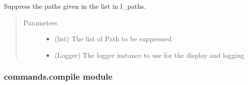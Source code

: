\documentclass[a4paper,10pt,english]{sphinxmanual}
\begin{document}

\begin{fulllineitems}
\label{\detokenize{apidoc_commands/commands:commands.clean.suppress_directories}}
Suppress the paths given in the list in l\_paths.
\begin{quote}\begin{description}
\item[{Parameters}] \leavevmode\begin{itemize}
\item {} 
 \textendash{} (list) The list of Path to be suppressed

\item {} 
 \textendash{} (Logger) 
The logger instance to use for the display and logging

\end{itemize}

\end{description}\end{quote}

\end{fulllineitems}



\subsubsection{commands.compile module}
\label{\detokenize{apidoc_commands/commands:commands-compile-module}}\label{\detokenize{apidoc_commands/commands:module-commands.compile}}
\end{document}

